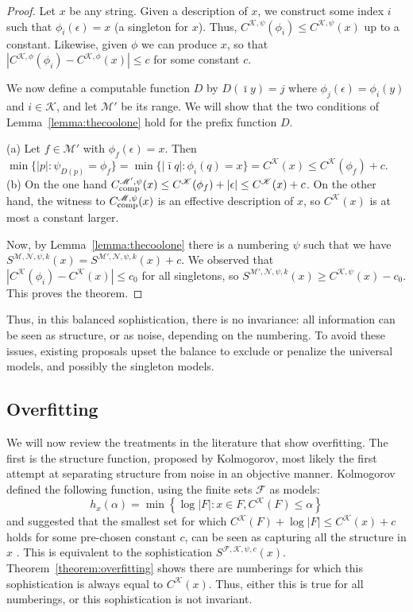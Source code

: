 \documentclass{style/llncs}
\newcommand{\M}{\mathscr M}
\newcommand{\F}{\mathscr F}
\newcommand{\K}{\mathscr K}
\newcommand{\Nm}{\mathscr N}
\newcommand{\tn}[1]{\textnormal{#1}}
\newcommand{\Cc}{C_\tn{comp}}
\begin{document}
\begin{proof}
Let $x$ be any string. Given a description of $x$, we construct some index $i$ such that $\phi_i(\epsilon) = x$ (a singleton for $x$). Thus, $C^{\K, \psi}(\phi_i) \leq C^{\K,\psi}(x)$ up to a constant. Likewise, given $\phi$ we can produce $x$, so that $|C^{\K,\phi}(\phi_i)-C^{\K, \phi}(x)|\le c$ for some constant $c$. 

We now define a computable function $D$ by $D(\bar\imath y)=j$ where $\phi_j(\epsilon) = \phi_i(y)$ and $i \in \K$, and let $\M'$ be its range.  We will show that the two conditions of Lemma~\ref{lemma:thecoolone} hold for the prefix function $D$.

(a) Let $f \in \M'$ with $\phi_f(\epsilon) = x$. Then $\min\{|p|:\psi_{D(p)}=\phi_f\}=\min\{|\bar\imath q|:\phi_i(q)=x\}=C^{\K}(x) \le C^{\K}(\phi_f)+c$. (b) On the one hand $\Cc^{\M',\psi}(x)\le C^\K(\phi_f)+|\epsilon|\le C^\K(x)+c$. On the other hand, the witness to $\Cc^{\M,\psi}(x)$ is an effective description of $x$, so $C^{\K}(x)$ is at most a constant larger. 

Now, by Lemma~\ref{lemma:thecoolone} there is a numbering $\psi$ such that we have $S^{\M,\Nm,\psi,k}(x) =S^{\M',\Nm,\psi,k}(x) + c$. We observed that $|C^{\K}(\phi_i)-C^{\K}(x)|\le c_0$ for all singletons, so $S^{\M',\Nm,\psi, k}(x)\ge C^{\K,\psi}(x)-c_0$. This proves the theorem.
\end{proof}

\noindent Thus, in this balanced sophistication, there is no invariance: all information can be seen as structure, or as noise, depending on the numbering. To avoid these issues, existing proposals upset the balance to exclude or penalize the universal models, and possibly the singleton models. 

\subsection{Overfitting}

We will now review the treatments in the literature that show overfitting. The first is the structure function, proposed by Kolmogorov, most likely the first attempt at separating structure from noise in an objective manner. Kolmogorov defined the following function, using the finite sets $\F$ as models:
\[
h_x(\alpha) = \min \left \{\log |F| : x \in F, C^\K(F) \leq \alpha \right \} 
\]
and suggested that the smallest set for which $C^\K(F) + \log|F| \leq C^\K(x) + c$ holds for some pre-chosen constant $c$, can be seen as capturing all the structure in $x$ \cite{cover1985kolmogorov}. This is equivalent to the sophistication $S^{\F,\K,\psi,c}(x)$. Theorem~\ref{theorem:overfitting} shows there are numberings for which this sophistication is always equal to $C^\K(x)$. Thus, either this is true for all numberings, or this sophistication is not invariant.
 
\end{document}
